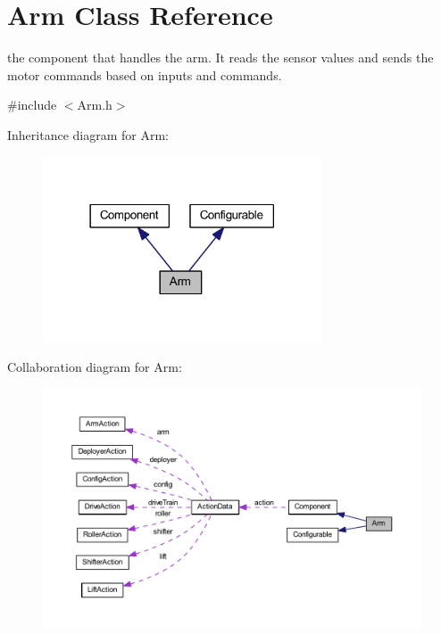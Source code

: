 \hypertarget{class_arm}{
\section{\-Arm \-Class \-Reference}
\label{class_arm}
}


the component that handles the arm. \-It reads the sensor values and sends the motor commands based on inputs and commands.  




{\ttfamily \#include $<$\-Arm.\-h$>$}



\-Inheritance diagram for \-Arm\-:\nopagebreak
\begin{figure}[H]
\begin{center}
\leavevmode
\includegraphics[width=234pt]{class_arm__inherit__graph}
\end{center}
\end{figure}


\-Collaboration diagram for \-Arm\-:\nopagebreak
\begin{figure}[H]
\begin{center}
\leavevmode
\includegraphics[width=350pt]{class_arm__coll__graph}
\end{center}
\end{figure}
